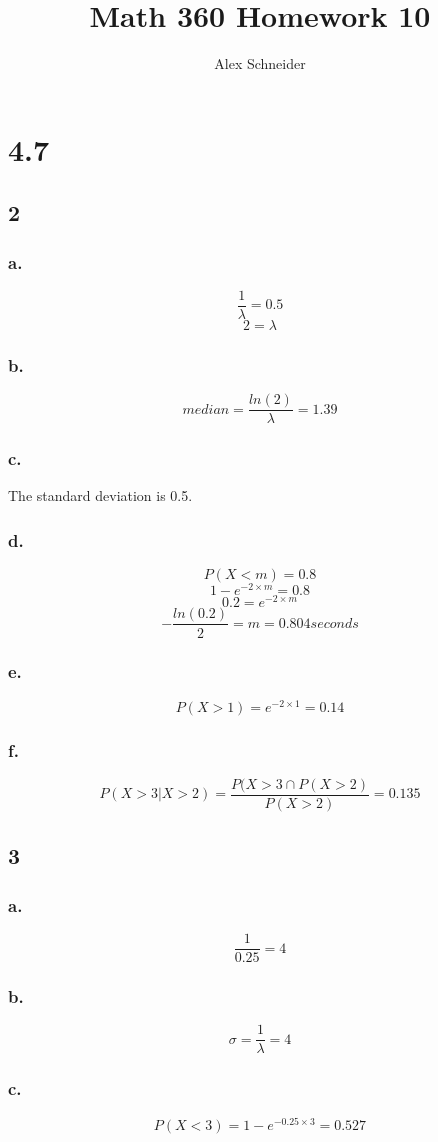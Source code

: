 \documentclass[11pt]{article}
\title{Math 360 Homework 10}
\author{Alex Schneider}
\begin{document}
\maketitle
\section{4.7}
\subsection{2}
\subsubsection{a.}
\[ \frac{1}{\lambda} = 0.5 \]
\[ 2 = \lambda \]
\subsubsection{b.}
\[ median = \frac{ln(2)}{\lambda} = 1.39 \]
\subsubsection{c.}
The standard deviation is 0.5.
\subsubsection{d.}
\[ P(X < m) = 0.8 \]
\[ 1 - e^{-2\times m} = 0.8 \]
\[ 0.2 = e^{-2\times m} \]
\[ -\frac{ln(0.2)}{2} = m = 0.804 seconds \]
\subsubsection{e.}
\[ P(X > 1) = e^{-2\times 1} = 0.14 \] 
\subsubsection{f.}
\[ P(X > 3 | X > 2) = \frac{P(X > 3 \cap P(X > 2)}{P(X > 2)} = 0.135 \]
\subsection{3}
\subsubsection{a.}
\[ \frac{1}{0.25} = 4 \]
\subsubsection{b.}
\[ \sigma = \frac{1}{\lambda} = 4 \]
\subsubsection{c.}
\[ P(X < 3) = 1 - e^{-0.25\times 3} = 0.527 \]
\end{document}
